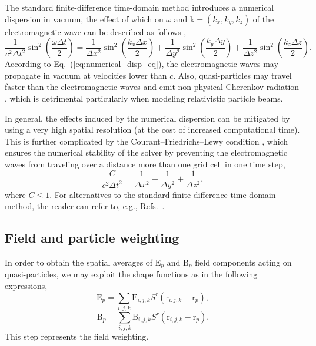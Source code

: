\documentclass[10pt, a4paper, twoside, openright]{report}
\renewcommand{\vec}[1]{\boldsymbol{\mathrm{#1}}}
\begin{document}
The standard finite-difference time-domain method introduces a numerical dispersion in vacuum, the effect of which on $ \omega $ and $ \vec{k} = \left( k_x, k_y, k_z \right) $ of the electromagnetic wave can be described as follows \cite{Vay2011}, 
\begin{equation}\label{eq:numerical_disp_eq}
	\frac{1}{c^2 \Delta t^2} \sin^2 \left(\frac{\omega \Delta t}{2}\right) = \frac{1}{\Delta x^2} \sin^2 \left(\frac{k_x \Delta x}{2}\right) + \frac{1}{\Delta y^2} \sin^2 \left(\frac{k_y \Delta y}{2}\right) + \frac{1}{\Delta z^2} \sin^2 \left(\frac{k_z \Delta z}{2}\right).
\end{equation}
According to Eq.~(\ref{eq:numerical_disp_eq}), the electromagnetic waves may propagate in vacuum at velocities lower than $ c $. Also, quasi-particles may travel faster than the electromagnetic waves and emit non-physical Cherenkov radiation \cite{Godfrey1974}, which is detrimental particularly when modeling relativistic particle beams. 

In general, the effects induced by the numerical dispersion can be mitigated by using a very high spatial resolution (at the cost of increased computational time). This is further complicated by the Courant--Friedrichs--Lewy condition \cite{Courant1928}, which ensures the numerical stability of the solver by preventing the electromagnetic waves from traveling over a distance more than one grid cell in one time step,
\begin{equation}\label{eq:cfl}
	\frac{C}{c^{2} \Delta t^{2}} = \frac{1}{\Delta x^{2}} + \frac{1}{\Delta y^{2}} + \frac{1}{\Delta z^{2}},
\end{equation}
where $ C \leq 1 $. For alternatives to the standard finite-difference time-domain method, the reader can refer to, e.g., Refs.~.

\subsection{Field and particle weighting}

In order to obtain the spatial averages of $ \vec{E}_{p} $ and $ \vec{B}_{p} $ field components acting on quasi-particles, we may exploit the shape functions as in the following expressions,
\begin{equation}\label{eq:E_weighting}
	\vec{E}_{p} = \sum_{i, j, k} \vec{E}_{i, j, k} S^r \left( \vec{r}_{i, j, k} - \vec{r}_{p} \right),
\end{equation}
\begin{equation}\label{eq:B_weighting}
	\vec{B}_{p} = \sum_{i, j, k} \vec{B}_{i, j, k} S^r \left( \vec{r}_{i, j, k} - \vec{r}_{p} \right).
\end{equation}
This step represents the field weighting.
\end{document}

